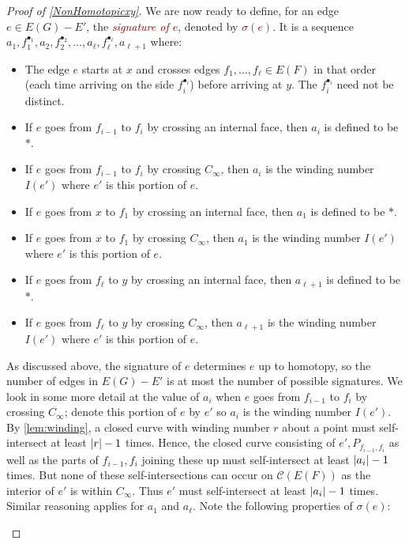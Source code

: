 \documentclass[a4paper,11pt]{article}
\DeclarePairedDelimiter{\abs}{\lvert}{\rvert} %
\newcommand{\defn}[1]{\textcolor{Maroon}{\emph{#1}}}
\newcommand{\CC}{\mathcal{C}}
\begin{document}
\begin{proof}[Proof of \cref{NonHomotopicxy}]
We are now ready to define, for an edge $e \in E(G) - E'$, the \defn{signature of $e$}, denoted by \defn{$\sigma(e)$}. It is a sequence $a_1, f_1^{\bullet_1}, a_2, f_2^{\bullet_2}, \dotsc, a_{\ell}, f_{\ell}^{\bullet_{\ell}}, a_{\ell + 1}$ where:
\begin{itemize}
    \item The edge $e$ starts at $x$ and crosses edges $f_1, \dotsc, f_{\ell} \in E(F)$ in that order (each time arriving on the side $f_i^{\bullet_i}$) before arriving at $y$. The $f_i^{\bullet_i}$ need not be distinct.
    \item If $e$ goes from $f_{i - 1}$ to $f_{i}$ by crossing an internal face, then $a_i$ is defined to be $\ast$.
    \item If $e$ goes from $f_{i - 1}$ to $f_{i}$ by crossing $C_{\infty}$, then $a_i$ is the winding number $I(e')$ where $e'$ is this portion of $e$.
    \item If $e$ goes from $x$ to $f_1$ by crossing an internal face, then $a_1$ is defined to be $\ast$.
    \item If $e$ goes from $x$ to $f_1$ by crossing $C_{\infty}$, then $a_1$ is the winding number $I(e')$ where $e'$ is this portion of $e$.
    \item If $e$ goes from $f_\ell$ to $y$ by crossing an internal face, then $a_{\ell + 1}$ is defined to be $\ast$.
    \item If $e$ goes from $f_\ell$ to $y$ by crossing $C_{\infty}$, then $a_{\ell + 1}$ is the winding number $I(e')$ where $e'$ is this portion of $e$.
\end{itemize}
As discussed above, the signature of $e$ determines $e$ up to homotopy, so the number of edges in $E(G) - E'$ is at most the number of possible signatures. We look in some more detail at the value of $a_i$ when $e$ goes from $f_{i - 1}$ to $f_i$ by crossing $C_{\infty}$; denote this portion of $e$ by $e'$ so $a_i$ is the winding number $I(e')$. By \cref{lem:winding}, a closed curve with winding number $r$ about a point must self-intersect at least $\abs{r} - 1$ times. Hence, the closed curve consisting of $e', P_{f_{i - 1}, f_i}$ as well as the parts of $f_{i - 1}, f_i$ joining these up must self-intersect at least $\abs{a_i} - 1$ times. But none of these self-intersections can occur on $\CC(E(F))$ as the interior of $e'$ is within $C_{\infty}$. Thus $e'$ must self-intersect at least $\abs{a_i} - 1$ times. Similar reasoning applies for $a_1$ and $a_\ell$. Note the following properties of $\sigma(e)$:
\begin{itemize}

\end{itemize}
\end{proof}
\end{document}
